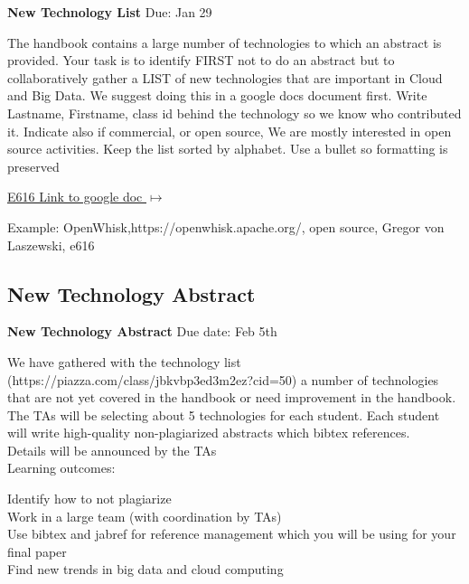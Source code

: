 \begin{exercise} \label{a:e6161-new-tech-list}

{\bf New Technology List} Due: Jan 29 

The handbook contains a large number of technologies to which an abstract is provided. Your task is to identify FIRST not to do an abstract but to collaboratively gather a LIST of new technologies that are important in Cloud and Big Data. We suggest doing this in a google docs document first. Write Lastname, Firstname, class id behind the technology so we know who contributed it. Indicate also if commercial, or open source, We are mostly interested in open source activities. Keep the list sorted by alphabet. Use a bullet so formatting is preserved

 
{\hfill \href{https://docs.google.com/document/d/1LeHGHTSBbaPXYVor0efhmi5W7JJjS7EQHABHqgRAPuU/edit?usp=sharing}{E616 Link to google doc $\mapsto$}}
 
Example: OpenWhisk,https://openwhisk.apache.org/, open source, Gregor von Laszewski, e616
 
\end{exercise}


\subsection{New Technology Abstract}

\begin{exercise}\label{a:e6161-new-tech-abstracts}
 
{\bf New Technology Abstract} Due date: Feb 5th

We have gathered with the technology list (https://piazza.com/class/jbkvbp3ed3m2ez?cid=50) a number of technologies that are not yet covered in the handbook or need improvement in the handbook.\\

The TAs will be selecting about 5 technologies for each student. Each student will write high-quality non-plagiarized abstracts which bibtex references.\\
 
Details will be announced by the TAs\\
 
Learning outcomes:

\noindent Identify how to not plagiarize\\
Work in a large team (with coordination by TAs)\\
Use bibtex and jabref for reference management which you will be using for your final paper\\
Find new trends in big data and cloud computing\\

\end{exercise}


